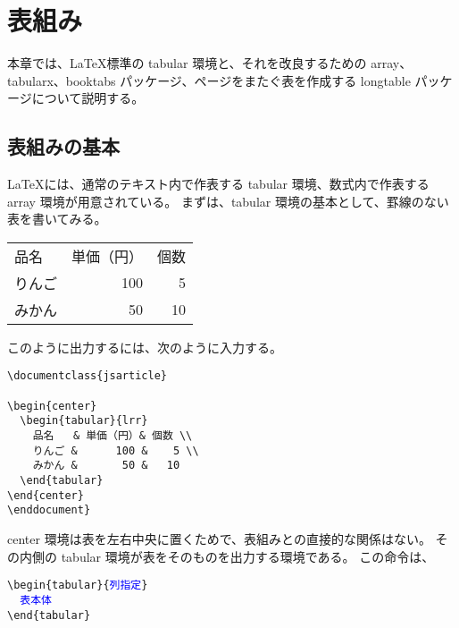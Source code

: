 \chapter{表組み}
本章では、\LaTeX{}標準の tabular 環境と、それを改良するための array、tabularx、booktabs パッケージ、ページをまたぐ表を作成する longtable パッケージについて説明する。
\section{表組みの基本}
\LaTeX{}には、通常のテキスト内で作表する tabular 環境、数式内で作表する array 環境が用意されている。
まずは、tabular 環境の基本として、罫線のない表を書いてみる。
\begin{center}
  \begin{tabular}{lrr}
    品名   & 単価（円）& 個数 \\
    りんご &       100 &    5 \\
    みかん &        50 &   10
  \end{tabular}
\end{center}
このように出力するには、次のように入力する。
\begin{mdframed}[roundcorner=0.50zw,leftmargin=3.00zw,rightmargin=3.00zw,skipabove=0.40zw,skipbelow=0.40zw,innertopmargin=4.00pt,innerbottommargin=4.00pt,innerleftmargin=5.00pt,innerrightmargin=5.00pt,linecolor=gray!020,linewidth=0.50pt,backgroundcolor=gray!20]
\begin{verbatim}
\documentclass{jsarticle}

\begin{center}
  \begin{tabular}{lrr}
    品名   & 単価（円）& 個数 \\
    りんご &      100 &    5 \\
    みかん &       50 &   10
  \end{tabular}
\end{center}
\enddocument}
\end{verbatim}
\end{mdframed}
center 環境は表を左右中央に置くためで、表組みとの直接的な関係はない。
その内側の tabular 環境が表をそのものを出力する環境である。
この命令は、
\begin{mdframed}[roundcorner=0.50zw,leftmargin=3.00zw,rightmargin=3.00zw,skipabove=0.40zw,skipbelow=0.40zw,innertopmargin=4.00pt,innerbottommargin=4.00pt,innerleftmargin=5.00pt,innerrightmargin=5.00pt,linecolor=gray!020,linewidth=0.50pt,backgroundcolor=gray!20]
  \verb`\begin{tabular}{`\texttt{\textcolor{blue}{列指定}}\verb`}` \\
  \verb`  `\texttt{\textcolor{blue}{表本体}}                       \\
  \verb`\end{tabular}`
\end{mdframed}
